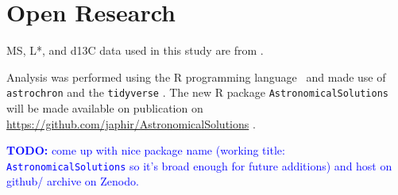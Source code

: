 \documentclass[draft]{agujournal2019}
\newcommand{\ijk}{\textcolor{blue}}
\begin{document}
%
%

%

%



\section*{Open Research}

\Gls{MS}, \gls{L*}, and \gls{d13C} data used in this study are from .

Analysis was performed using the R programming language~\cite{RCoreTeam2020} and made use of \texttt{astrochron}  and the \texttt{tidyverse} .
The new R package \texttt{AstronomicalSolutions} will be made available on publication on \url{https://github.com/japhir/AstronomicalSolutions} .

\ijk{\textbf{TODO:} come up with nice package name (working title: \texttt{AstronomicalSolutions} so it's broad enough for future additions) and host on github/ archive on Zenodo.}

\end{document}
